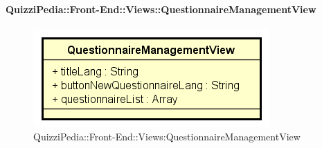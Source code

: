 \paragraph{QuizziPedia::Front-End::Views::QuestionnaireManagementView}
\begin{figure} [ht]
	\centering
	\includegraphics[scale=0.45]{UML/Classi/Front-End/QuizziPedia_Front-end_QuestionnaireManagementView.png}
	\caption{QuizziPedia::Front-End::Views:QuestionnaireManagementView}
\end{figure} \FloatBarrier
